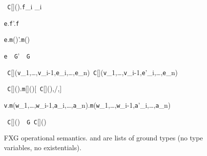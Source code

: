\begin{figure*}
\vspace{-\bigskipamount}
\begin{minipage}{.33\textwidth}
\quad{}
	{\new~{\tt C}[]().{\tt f}_i _i}

	{{\tt e}.{\tt f}'.{\tt f}}

	{{\tt e}.{\tt m}()'.{\tt m}()}

	{{\tt e}~\as~{\tt G}'~\as~{\tt G}}
\end{minipage}%
\begin{minipage}{.67\textwidth}
\quad{}
	{\new~{\tt C}[]({\tt v}_1,\ldots,{\tt v}_{i-1},{\tt e}_i,\ldots,{\tt e}_n)\derives\new~{\tt C}[]({\tt v}_1,\ldots,{\tt v}_{i-1},{\tt e}'_i,\ldots,{\tt e}_n)}

	{\new~{\tt C}[]().{\tt m}[]()[\new~{\tt C}[](),/\this,]}

	{{\tt v}.{\tt m}({\tt w}_1,\ldots,{\tt w}_{i-1},{\tt a}_i,\ldots,{\tt a}_n).{\tt m}({\tt w}_1,\ldots,{\tt w}_{i-1},{\tt a}'_i,\ldots,{\tt a}_n)}

	{\new~{\tt C}[]()~\as~{\tt G}\derives\new~{\tt C}[]()}
\end{minipage}
\caption{{\sf FXG} operational semantics.  and  are lists of ground types (no type variables, no existentials).}
\label{fig:sos}
\end{figure*}


